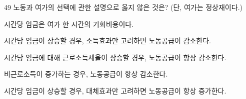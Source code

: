 \begin{question}{49}
노동과 여가의 선택에 관한 설명으로 옳지 않은 것은? (단, 여가는 정상재이다.)
\begin{choices}
  \item 시간당 임금은 여가 한 시간의 기회비용이다.
  \item 시간당 임금이 상승할 경우, 소득효과만 고려하면 노동공급이 감소한다.
  \item 시간당 임금에 대해 근로소득세율이 상승할 경우, 노동공급이 항상 감소한다.
  \item 비근로소득이 증가하는 경우, 노동공급이 항상 감소한다.
  \item 시간당 임금이 상승할 경우, 대체효과만 고려하면 노동공급이 항상 증가한다.
\end{choices}
\end{question}
